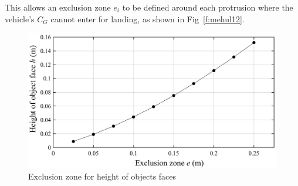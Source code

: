 \noindent This allows an exclusion zone $e_i$ to be defined around each protrusion where the vehicle's $C_G$ cannot enter for landing, as shown in Fig~\ref{f:mehul12}. 

\begin{figure}[!ht]
\centering
\includegraphics[width=5.5in]{./images/mehul13.png}
\caption{Exclusion zone for height of objects faces}
\label{f:mehul13}
\end{figure}

